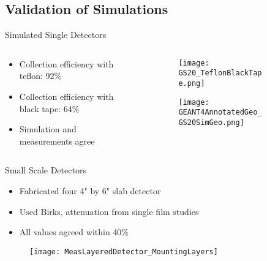 \subsection{Validation of Simulations}
\begin{frame}{Simulated Single Detectors}
\label{G4LightMain}
  \begin{columns}[onlytextwidth]
    \begin{column}{0.55\textwidth}
      \begin{itemize}
        \item Collection efficiency with teflon: 92\%
        \item Collection efficiency with black tape: 64\%
        \item Simulation and measurements agree
      \end{itemize}
    \end{column}
    \begin{column}{0.4\textwidth}
      \begin{figure}
        \vspace*{-1cm}
        \begin{subfigure}[b]{\textwidth}
        \texttt{[image: GS20\_TeflonBlackTape.png]}
        \end{subfigure}
        
        \begin{subfigure}[b]{\textwidth}
        \texttt{[image: GEANT4AnnotatedGeo\_GS20SimGeo.png]}
        \end{subfigure}
      \end{figure}
    \end{column}
  \end{columns}
\hyperlink{G4Intro}{}
\end{frame}
\begin{frame}{Small Scale Detectors}
\begin{itemize}
  \small
  \item Fabricated four 4" by 6" slab detector \hyperlink{G4Intro}{}
  \item Used Birks, attenuation from single film studies
  \item All values agreed within 40\%
\end{itemize}
\begin{figure}
	\centering
	\texttt{[image: MeasLayeredDetector\_MountingLayers]}
\end{figure}
\end{frame}
